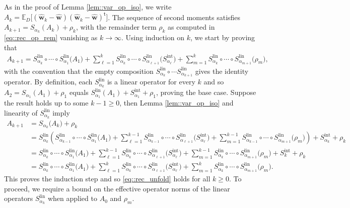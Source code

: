 \documentclass{article}
\newcommand*{\E}{\mathbb{E}} %
\newcommand*{\bfw}{\mathbf{w}}
\newcommand*{\tran}{^{\mathsf{t}}}
\newcommand{\whweight}{\widehat{\bfw}}
\newcommand{\Slin}{S^{\mathrm{lin}}}
\newcommand{\Sint}{S^{\mathrm{int}}}
\begin{document}
As in the proof of Lemma \ref{lem::var_op_iso}, we write $A_k =
\E_D\big[(\whweight_k - \whweight) (\whweight_k - \whweight)\tran\big]$. The
sequence of second moments satisfies $A_{k + 1} = S_{\alpha_k}(A_k) + \rho_k$,
with the remainder term $\rho_k$ as computed in \eqref{eq::rec_op_rem} vanishing
as $k \to \infty$. Using induction on $k$, we start by proving that
\begin{align}
  \label{eq::rec_unfold}
  A_{k + 1} = \Slin_{\alpha_k} \circ \cdots \circ \Slin_{\alpha_1}\big(A_1\big)
  + \sum_{\ell = 1}^k \Slin_{\alpha_k} \circ \cdots \circ \Slin_{\alpha_{\ell +
  1}} \big(\Sint_{\alpha_\ell}\big) + \sum_{m = 1}^k \Slin_{\alpha_k} \circ
  \cdots \circ \Slin_{\alpha_{m + 1}}\big(\rho_m\big),
\end{align} with the convention that the empty composition $\Slin_{\alpha_k}
\circ \cdots \Slin_{\alpha_{k + 1}}$ gives the identity operator. By definition,
each $\Slin_{\alpha_k}$ is a linear operator for every $k$ and so $A_2 =
S_{\alpha_1}(A_1) + \rho_1$ equals $\Slin_{\alpha_1}(A_1) + \Sint_{\alpha_1} +
\rho_1$, proving the base case. Suppose the result holds up to some $k - 1 \geq
0$, then Lemma \ref{lem::var_op_iso} and linearity of $\Slin_{\alpha_k}$ imply
\begin{align*}
  A_{k + 1} &= S_{\alpha_k}\big(A_k\big) + \rho_k\\
  &= \Slin_{\alpha_k}\left(\Slin_{\alpha_{k - 1}} \circ \cdots \circ
  \Slin_{\alpha_1}\big(A_1\big) + \sum_{\ell = 1}^{k - 1} \Slin_{\alpha_{k - 1}}
  \circ \cdots \circ \Slin_{\alpha_{\ell + 1}} \big(\Sint_{\alpha_\ell}\big) +
  \sum_{m = 1}^{k - 1} \Slin_{\alpha_{k - 1}} \circ \cdots \circ
  \Slin_{\alpha_{m + 1}}\big(\rho_m\big)\right) + \Sint_{\alpha_k} + \rho_k\\
  &= \Slin_{\alpha_k} \circ \cdots \circ \Slin_{\alpha_1}\big(A_1\big) +
  \sum_{\ell = 1}^{k - 1} \Slin_{\alpha_k} \circ \cdots \circ
  \Slin_{\alpha_{\ell + 1}} \big(\Sint_{\alpha_\ell}\big) + \sum_{m = 1}^{k - 1}
  \Slin_{\alpha_k} \circ \cdots \circ \Slin_{\alpha_{m + 1}}\big(\rho_m\big) +
  \Sint_k + \rho_k\\
  &= \Slin_{\alpha_k} \circ \cdots \circ \Slin_{\alpha_1}\big(A_1\big) +
  \sum_{\ell = 1}^k \Slin_{\alpha_k} \circ \cdots \circ \Slin_{\alpha_{\ell +
  1}} \big(\Sint_{\alpha_\ell}\big) + \sum_{m = 1}^k \Slin_{\alpha_k} \circ
  \cdots \circ \Slin_{\alpha_{m + 1}}\big(\rho_m\big).
\end{align*} This proves the induction step and so \eqref{eq::rec_unfold} holds
for all $k \geq 0$. To proceed, we require a bound on the effective operator
norms of the linear operators $\Slin_{\alpha_k}$ when applied to $A_0$ and
$\rho_m$.
\end{document}
